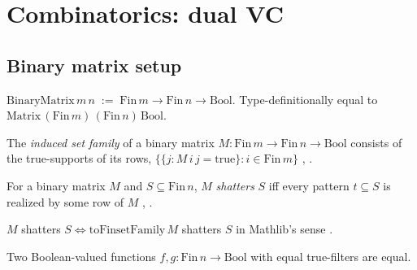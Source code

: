 \chapter{Combinatorics: dual VC}\label{chap:combinatorics}

\section{Binary matrix setup}\label{sec:binary-matrix}

\begin{defn}
\label{def:binary-matrix}
  \leanok
$\mathrm{BinaryMatrix}\,m\,n \;:=\; \mathrm{Fin}\,m \to \mathrm{Fin}\,n \to \mathrm{Bool}$.
Type-definitionally equal to $\mathrm{Matrix}\,(\mathrm{Fin}\,m)\,(\mathrm{Fin}\,n)\,\mathrm{Bool}$.
\end{defn}

\begin{defn}
\label{def:to-finset-family}
  \leanok
The \emph{induced set family} of a binary matrix $M : \mathrm{Fin}\,m \to \mathrm{Fin}\,n \to \mathrm{Bool}$
consists of the true-supports of its rows,
$\{ \{ j : M\,i\,j = \mathrm{true} \} : i \in \mathrm{Fin}\,m \}$
\cite{vapnik1971}, \cite{sauer1972}.
\end{defn}

\begin{defn}
\label{def:shatters}
  \leanok
For a binary matrix $M$ and $S \subseteq \mathrm{Fin}\,n$, $M$
\emph{shatters} $S$ iff every pattern $t \subseteq S$ is realized by
some row of $M$ \cite{vapnik1971}, \cite{sauer1972}.
\end{defn}

\begin{thm}
\label{thm:shatters-iff}
  \leanok
$M$ shatters $S \iff \mathrm{toFinsetFamily}\,M$ shatters $S$ in
Mathlib's sense \cite{sauer1972}.
\end{thm}

\begin{lemma}
\label{lem:bool-fun-eq-of-filter-eq}
  \leanok
Two Boolean-valued functions $f, g : \mathrm{Fin}\,n \to \mathrm{Bool}$
with equal true-filters are equal.
\end{lemma}

